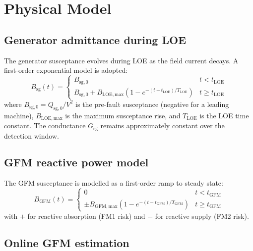 \documentclass[11pt,a4paper]{article}
\newcommand{\Tloe}{T_{\mathrm{LOE}}}
\begin{document}
\section{Physical Model}
\label{sec:model}

\subsection{Generator admittance during LOE}
\label{sec:sg_model}

The generator susceptance evolves during LOE as the field current decays.
A first-order exponential model is adopted:
\begin{equation}
  B_{\mathrm{sg}}(t) =
  \begin{cases}
    B_{\mathrm{sg,0}} & t < t_{\mathrm{LOE}} \\
    B_{\mathrm{sg,0}} + B_{\mathrm{LOE,max}}
    \!\left(1 - e^{-(t - t_{\mathrm{LOE}})/\Tloe}\right)
    & t \geq t_{\mathrm{LOE}}
  \end{cases}
  \label{eq:bsg}
\end{equation}
where $B_{\mathrm{sg,0}} = Q_{\mathrm{sg,0}}/V^2$ is the pre-fault susceptance
(negative for a leading machine), $B_{\mathrm{LOE,max}}$ is the maximum
susceptance rise, and $\Tloe$ is the LOE time constant.  The conductance
$G_{\mathrm{sg}}$ remains approximately constant over the detection window.

\subsection{GFM reactive power model}
\label{sec:gfm_model}

The GFM susceptance is modelled as a first-order ramp to steady state:
\begin{equation}
  B_{\mathrm{GFM}}(t) =
  \begin{cases}
    0 & t < t_{\mathrm{GFM}} \\
    \pm B_{\mathrm{GFM,max}}
    \!\left(1 - e^{-(t - t_{\mathrm{GFM}})/T_{\mathrm{GFM}}}\right)
    & t \geq t_{\mathrm{GFM}}
  \end{cases}
  \label{eq:bgfm}
\end{equation}
with $+$ for reactive absorption (FM1 risk) and $-$ for reactive supply (FM2
risk).

\subsection{Online GFM estimation}
\label{sec:estimation}
\end{document}
